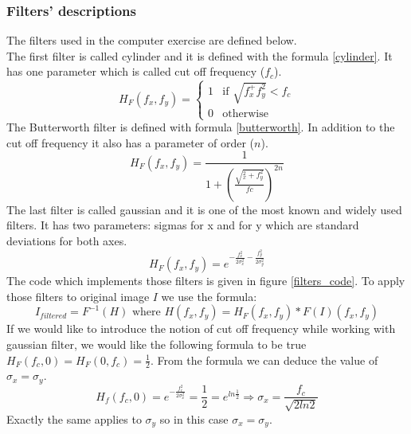 \documentclass[a4paper]{article}
\begin{document}
    	\subsubsection{Filters' descriptions}
The filters used in the computer exercise are defined below.\\
The first filter is called cylinder and it is defined with the formula \ref{cylinder}. It has one parameter which is called cut off frequency ($f_c$).
\begin{equation}
\label{cylinder}
H_F(f_x,f_y) = \begin{cases}
               1 & \text{if } \sqrt{f_x^+f_y^2} < f_c\\
               0 & \text{otherwise}
            \end{cases}
\end{equation}
The Butterworth filter is defined with formula \ref{butterworth}. In addition to the cut off frequency it also has a parameter of order ($n$).
\begin{equation}
\label{butterworth}
H_F(f_x,f_y)=\frac{1}{1 + (\frac{\sqrt{_x^2+f_y^2}}{fc})^{2n}}
\end{equation}
The last filter is called gaussian and it is one of the most known and widely used filters. It has two parameters: sigmas for x and for y which are standard deviations for both axes.
\begin{equation}
H_F(f_x,f_y)=e^{-\frac{f_x^2}{2\sigma_x^2}-\frac{f_y^2}{2\sigma_y^2}}
\end{equation}
The code which implements those filters is given in figure \ref{filters_code}. To apply those filters to original image $I$ we use the formula:
\begin{equation}
\label{filter_formula}
I_{filtered} = F^{-1}(H) \text{ where } H(f_x, f_y) = H_F(f_x, f_y) * F(I)(f_x, f_y)
\end{equation}
If we would like to introduce the notion of cut off frequency while working with gaussian filter, we would like the following formula to be true $H_F(f_c,0)=H_F(0,f_c)=\frac{1}{2}$. From the formula we can deduce the value of $\sigma_x=\sigma_y$.
\begin{equation*}
H_f(f_c,0)=e^{-\frac{f_c^2}{2\sigma_x^2}}=\frac{1}{2}=e^{ln\frac{1}{2}} \Rightarrow \sigma_x = \frac{f_c}{\sqrt{2ln2}}
\end{equation*}
Exactly the same applies to $\sigma_y$ so in this case $\sigma_x = \sigma_y$.
\end{document}
